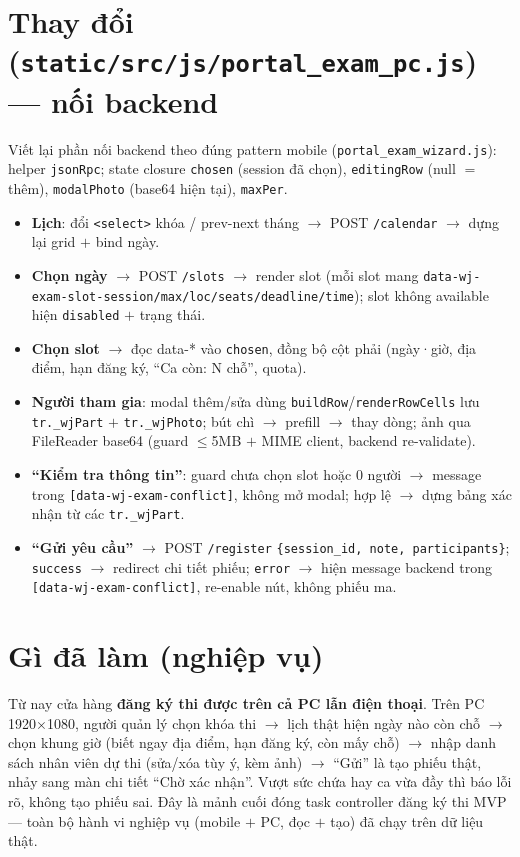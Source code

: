 \section{Thay đổi (\texttt{static/src/js/portal\_exam\_pc.js}) --- nối backend}

Viết lại phần nối backend theo đúng pattern mobile (\texttt{portal\_exam\_wizard.js}):
helper \texttt{jsonRpc}; state closure \texttt{chosen} (session đã chọn), \texttt{editingRow}
(null $=$ thêm), \texttt{modalPhoto} (base64 hiện tại), \texttt{maxPer}.

\begin{itemize}
  \item \textbf{Lịch}: đổi \texttt{<select>} khóa / prev-next tháng $\rightarrow$ POST
    \texttt{/calendar} $\rightarrow$ dựng lại grid $+$ bind ngày.
  \item \textbf{Chọn ngày} $\rightarrow$ POST \texttt{/slots} $\rightarrow$ render slot
    (mỗi slot mang \texttt{data-wj-exam-slot-session/max/loc/seats/deadline/time}); slot
    không available hiện \texttt{disabled} $+$ trạng thái.
  \item \textbf{Chọn slot} $\rightarrow$ đọc data-* vào \texttt{chosen}, đồng bộ cột phải
    (ngày·giờ, địa điểm, hạn đăng ký, ``Ca còn: N chỗ'', quota).
  \item \textbf{Người tham gia}: modal thêm/sửa dùng \texttt{buildRow}/\texttt{renderRowCells}
    lưu \texttt{tr.\_wjPart} $+$ \texttt{tr.\_wjPhoto}; bút chì $\rightarrow$ prefill $\rightarrow$
    thay dòng; ảnh qua FileReader base64 (guard $\leq$5MB $+$ MIME client, backend re-validate).
  \item \textbf{``Kiểm tra thông tin''}: guard chưa chọn slot hoặc 0 người $\rightarrow$
    message trong \texttt{[data-wj-exam-conflict]}, không mở modal; hợp lệ $\rightarrow$ dựng
    bảng xác nhận từ các \texttt{tr.\_wjPart}.
  \item \textbf{``Gửi yêu cầu''} $\rightarrow$ POST \texttt{/register}
    \texttt{\{session\_id, note, participants\}}; \texttt{success} $\rightarrow$ redirect
    chi tiết phiếu; \texttt{error} $\rightarrow$ hiện message backend trong
    \texttt{[data-wj-exam-conflict]}, re-enable nút, không phiếu ma.
\end{itemize}

\section{Gì đã làm (nghiệp vụ)}

Từ nay cửa hàng \textbf{đăng ký thi được trên cả PC lẫn điện thoại}. Trên PC 1920$\times$1080,
người quản lý chọn khóa thi $\rightarrow$ lịch thật hiện ngày nào còn chỗ $\rightarrow$ chọn
khung giờ (biết ngay địa điểm, hạn đăng ký, còn mấy chỗ) $\rightarrow$ nhập danh sách nhân
viên dự thi (sửa/xóa tùy ý, kèm ảnh) $\rightarrow$ ``Gửi'' là tạo phiếu thật, nhảy sang màn
chi tiết ``Chờ xác nhận''. Vượt sức chứa hay ca vừa đầy thì báo lỗi rõ, không tạo phiếu
sai. Đây là mảnh cuối đóng task controller đăng ký thi MVP --- toàn bộ hành vi nghiệp vụ
(mobile $+$ PC, đọc $+$ tạo) đã chạy trên dữ liệu thật.

